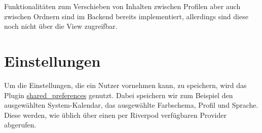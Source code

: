 Funktionalitäten zum Verschieben von Inhalten zwischen Profilen aber auch zwischen Ordnern sind im Backend bereits implementiert, allerdings sind diese noch
nicht über die View zugreifbar.

\section{Einstellungen}

Um die Einstellungen, die ein Nutzer vornehmen kann, zu speichern, wird das Plugin \href{https://pub.dev/packages/shared_preferences}{shared\_preferences} genutzt.
Dabei speichern wir zum Beispiel den ausgewählten System-Kalendar, das ausgewählte Farbschema, Profil und Sprache. Diese werden, wie üblich über einen per Riverpod verfügbaren Provider abgerufen.
